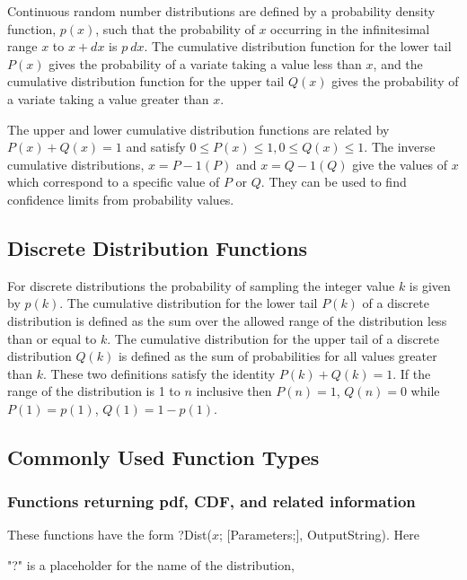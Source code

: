 Continuous random number distributions are defined by a probability density function, $p(x)$, such that the probability of $x$ occurring in the infinitesimal range $x$ to $x +dx$ is $p\ dx$. The cumulative distribution function for the lower tail $P(x)$ gives the probability of a variate taking a value less than $x$, and the cumulative distribution function for the upper tail $Q(x)$ gives the probability of a variate taking a value greater than $x$. 

The upper and lower cumulative distribution functions are related by $P(x) + Q(x) = 1$ and satisfy $0 \leq P(x) \leq 1, 0 \leq Q(x) \leq 1$. The inverse cumulative distributions, $x = P-1(P)$ and $x = Q-1(Q)$ give the values of $x$ which correspond to a specific value of $P$ or $Q$. They can be used to find confidence limits from probability values. 



\subsection{Discrete Distribution Functions}

For discrete distributions the probability of sampling the integer value $k$ is given by $p(k)$. The cumulative distribution for the lower tail $P(k)$ of a discrete distribution is defined as the sum over the allowed range of the distribution less than or equal to $k$. The cumulative distribution for the upper tail of a discrete distribution $Q(k)$ is defined as the sum of probabilities for all values greater than $k$. These two definitions satisfy the identity $P(k) + Q(k) = 1$. If the range of the distribution is 1 to $n$ inclusive then $P(n) = 1$, $Q(n) = 0$ while $P(1) = p(1)$, $Q(1) = 1 - p(1)$. 


\newpage
\subsection{Commonly Used Function Types}
\label{Commonly Used Distribution Function Types}

\subsubsection{Functions returning pdf, CDF, and related information}
\label{Functions returning pdf, CDF, and related information}
These functions have the form \textsf{?Dist($x$; [Parameters;], OutputString)}.
Here 

"?" is a placeholder for the name of the distribution, 

